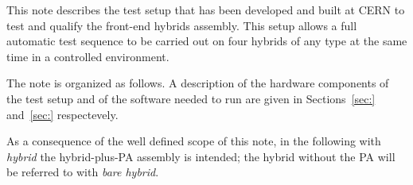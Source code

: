 This note describes the test setup that has been developed and built
at CERN to test and qualify the front-end hybrids assembly.
This setup allows a full automatic test sequence to be carried out on
four hybrids of any type at the same time in a controlled environment.

The note is organized as follows. A description of the hardware
components of the test setup and of the software needed to run are
given in Sections~\ref{sec:} and~\ref{sec:} respectevely.

As a consequence of the well defined scope of this note, in the
following with {\em hybrid} the hybrid-plus-PA assembly is intended;
the hybrid without the PA will be referred to with {\em bare hybrid}.


